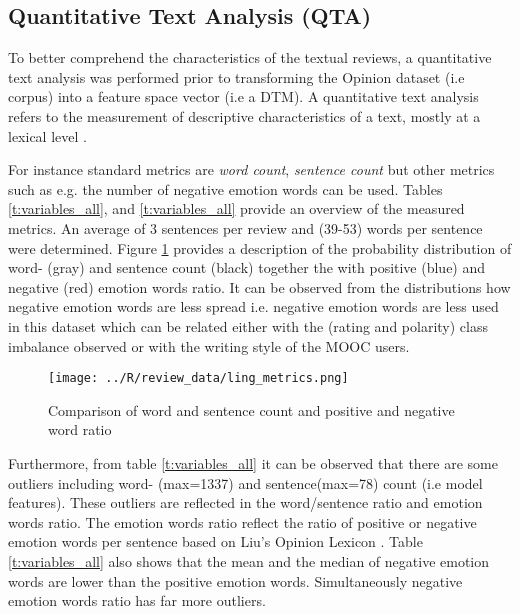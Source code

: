 \documentclass[
	a4paper,
	pdftex,
	12pt,	
	footinclude=true,
	fleqn,
	final,
	]{report}%
\begin{document}
\vspace{-0.45cm}
\subsection{Quantitative Text Analysis (QTA)}
\label{sec:quant_text}
\vspace{-0.3cm}
To better comprehend the characteristics of the textual reviews, 
a quantitative text analysis was performed prior to transforming 
the Opinion dataset (i.e corpus) into a feature space vector (i.e a DTM).
A quantitative text analysis refers to the measurement of descriptive 
characteristics of a text, mostly at a lexical level \cite{Pennebaker2010}. 

For instance standard metrics are \emph{word count}, 
\emph{sentence count} but other metrics such as e.g.
the number of negative emotion words can be used. Tables \ref{t:variables_all},
and \ref{t:variables_all} provide an overview of the measured 
metrics. An average of 3 sentences per review and 
(39-53) words  per sentence were determined.
Figure \ref{fig:26} provides a description of the 
probability distribution of word- (gray) and 
sentence count (black) together the with positive (blue)
and negative (red) emotion words ratio. It can be observed from
the distributions how negative emotion words are less 
spread i.e. negative emotion words are less used in this dataset
which can be related either with the (rating and polarity)
class imbalance observed or with the writing style of the 
MOOC users.

\begin{figure}[h]
 \centering
 \texttt{[image: ../R/review\_data/ling\_metrics.png]}
 \caption[Probability distribution of text metrics]{Comparison of word and sentence count and positive and negative word ratio}
 \label{fig:26}
\end{figure}
Furthermore, from table \ref{t:variables_all} it can be observed that there 
are some outliers including word- (max=1337) and sentence(max=78) count 
(i.e model features). These outliers are reflected in the word/sentence ratio and 
emotion words ratio. The emotion words ratio reflect the ratio of 
positive or negative emotion words per sentence based on Liu's
Opinion Lexicon \cite{Liu2004}. Table \ref{t:variables_all} also 
shows that the mean and the median of negative emotion words are 
lower than the positive emotion words. Simultaneously
negative emotion words ratio has far more outliers. 
\end{document}
